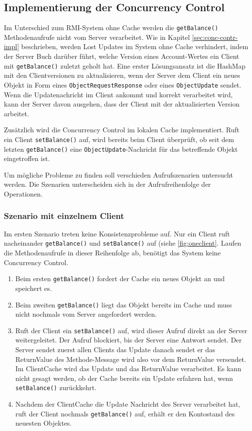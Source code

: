 \subsection{Implementierung der Concurrency Control}
\label{sec:impl-der-conc}

Im Unterschied zum RMI-System ohne Cache werden die \texttt{getBalance()} Methodenaufrufe nicht vom Server verarbeitet. Wie in Kapitel \ref{sec:conc-contr-impl} beschrieben, werden Lost Updates im System ohne Cache verhindert, indem der Server Buch darüber führt, welche Version eines Account-Wertes ein Client mit \texttt{getBalance()} zuletzt geholt hat. Eine erster Lösungsansatz ist die HashMap mit den Clientversionen zu aktualisieren, wenn der Server dem Client ein neues Objekt in Form eines \texttt{ObjectRequestResponse} oder eines \texttt{ObjectUpdate} sendet. Wenn die Updatenachricht im Client ankommt und korrekt verarbeitet wird, kann der Server davon ausgehen, dass der Client mit der aktualisierten Version arbeitet.

Zusätzlich wird die Concurrency Control im lokalen Cache implementiert. Ruft ein Client \texttt{setBalance()} auf, wird bereits beim Client überprüft, ob seit dem letzten \texttt{getBalance()} eine \texttt{ObjectUpdate}-Nachricht für das betreffende Objekt eingetroffen ist. 

Um mögliche Probleme zu finden soll verschieden Aufrufszenarien untersucht werden. Die Szenarien unterscheiden sich in der Aufrufreihenfolge der Operationen.

\subsubsection{Szenario mit einzelnem Client}
\label{sec:mogl-aufr}

Im ersten Szenario treten keine Konsistenzprobleme auf. Nur ein Client ruft nacheinander \texttt{getBalance()} und \texttt{setBalance()} auf (siehe \ref{fig:oneclient}. Laufen die Methodenaufrufe in dieser Reihenfolge ab, benötigt das System keine Concurrency Control.

\begin{enumerate}
\item Beim ersten \verb|getBalance()| fordert der Cache ein neues Objekt an und speichert es.
\item Beim zweiten \verb|getBalance()|  liegt das Objekt bereits im Cache und muss nicht nochmals vom Server angefordert werden.
\item Ruft der Client ein \verb|setBalance()| auf, wird dieser Aufruf direkt an der Server weitergeleitet. Der Aufruf blockiert, bis der Server eine Antwort sendet. Der Server sendet zuerst allen Clients das Update danach sendet er das ReturnValue des Methode-Message wird also vor dem ReturnValue versendet. Im ClientCache wird das Update und das ReturnValue verarbeitet. Es kann nicht gesagt werden, ob der Cache bereits ein Update erfahren hat, wenn  \verb|setBalance()|  zurückkehrt.
\item Nachdem der ClientCache die Update Nachricht des Server verarbeitet hat, ruft der Client nochmals \verb|getBalance()| auf, erhält er den Kontostand des neuesten Objektes.
\end{enumerate}

